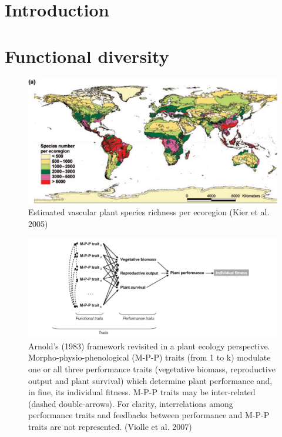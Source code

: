 \documentclass[
  12pt,
  oneside]{book}
\begin{document}

\hypertarget{introduction-3}{%
\section{Introduction}\label{introduction-3}}

\hypertarget{functional-diversity}{%
\section{Functional diversity}\label{functional-diversity}}

\begin{figure}

{\centering \includegraphics[width=0.8\linewidth]{figures/chap7/f71_species_map_Kier} 

}

\caption{Estimated vascular plant species richness per ecoregion (Kier et al. 2005)}\label{fig:f71}
\end{figure}

\begin{figure}

{\centering \includegraphics[width=0.8\linewidth]{figures/chap7/f72_violle} 

}

\caption{Arnold’s (1983) framework revisited in a plant ecology perspective. Morpho-physio-phenological (M-P-P) traits (from 1 to k) modulate one or all three performance traits (vegetative biomass, reproductive output and plant survival) which determine plant performance and, in fine, its individual fitness. M-P-P traits may be inter-related (dashed double-arrows). For clarity, interrelations among performance traits and feedbacks between performance and M-P-P traits are not represented. (Violle et al. 2007)}\label{fig:f72}
\end{figure}
\end{document}
